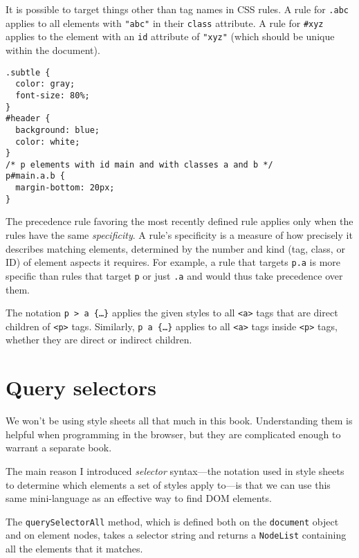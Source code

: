 It is possible to target things other than tag names in CSS rules. A rule for \lstinline`.abc` applies to all elements with \lstinline`"abc"` in their \lstinline`class` attribute. A rule for \lstinline`#xyz` applies to the element with an \lstinline`id` attribute of \lstinline`"xyz"` (which should be unique within the document).

\begin{lstlisting}
.subtle {
  color: gray;
  font-size: 80%;
}
#header {
  background: blue;
  color: white;
}
/* p elements with id main and with classes a and b */
p#main.a.b {
  margin-bottom: 20px;
}
\end{lstlisting}
\noindent{}

The precedence rule favoring the most recently defined rule applies only when the rules have the same \emph{specificity}. A rule's specificity is a measure of how precisely it describes matching elements, determined by the number and kind (tag, class, or ID) of element aspects it requires. For example, a rule that targets \lstinline`p.a` is more specific than rules that target \lstinline`p` or just \lstinline`.a` and would thus take precedence over them.

The notation \lstinline`p > a {…}` applies the given styles to all \lstinline`<a>` tags that are direct children of \lstinline`<p>` tags. Similarly, \lstinline`p a {…}` applies to all \lstinline`<a>` tags inside \lstinline`<p>` tags, whether they are direct or indirect children.

\section{Query selectors}

We won't be using style sheets all that much in this book. Understanding them is helpful when programming in the browser, but they are complicated enough to warrant a separate book.

The main reason I introduced \emph{selector} syntax—the notation used in style sheets to determine which elements a set of styles apply to—is that we can use this same mini-language as an effective way to find DOM elements.

The \lstinline`querySelectorAll` method, which is defined both on the \lstinline`document` object and on element nodes, takes a selector string and returns a \lstinline`NodeList` containing all the elements that it matches.

